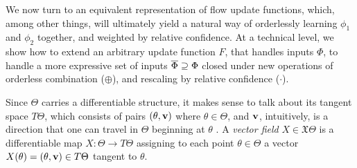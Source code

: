 We now turn to an equivalent representation of 
flow
update functions, which, among
other things, will ultimately
yield a natural way of
orderlessly learning $\phi_1$ and $\phi_2$ together, and weighted by relative
confidence. 
%
At a technical level, we show how to
extend an arbitrary update function $F$, that handles inputs $\Phi$,
to handle a more expressive set of inputs $\overline \Phi \supseteq \Phi$
closed under new operations of
orderless combination ($\oplus$), and rescaling by relative confidence ($\cdot$).

Since $\Theta$ carries a differentiable structure,
it makes sense to talk about its tangent space
$T\Theta$,
which consists of pairs $(\theta, \mathbf v)$ where
$\theta \in \Theta$, and $\mathbf v$,
intuitively, is a direction that one can travel in $\Theta$ beginning at $\theta$
\parencite[\S3]{lee2013smooth}.
%
%
A \emph{vector field} $X \in \mathfrak X\Theta$ is a
differentiable
map $X : \Theta \to T \Theta$
assigning to each point  $\theta \in \Theta$
a vector $X(\theta) = (\theta, \mathbf v) \in T\Theta$
tangent to $\theta$.
%
%
